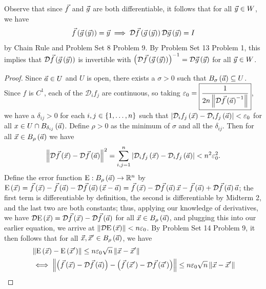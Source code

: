 \documentclass[main.tex]{subfiles}
\begin{document}
\begin{remark}
    Observe that since $\vec{f}$ and $\vec{g}$ are both differentiable, it follows that for all $\vec{y}\in W$, we have
    \[\vec{f}\left( \vec{g}\left( \vec{y} \right) \right) = \vec{y} \implies \mathcal{D}\vec{f}\left( \vec{g}\left( \vec{y} \right) \right)\mathcal{D}\vec{g}\left( \vec{y} \right) = I\]
    by Chain Rule and Problem Set 8 Problem 9. By Problem Set 13 Problem 1, this implies that $\mathcal{D}\vec{f}\left( \vec{g}\left( \vec{y} \right) \right)$ is invertible with $\left( \mathcal{D}\vec{f}\left( \vec{g}\left( \vec{y} \right) \right) \right)^{-1} = \mathcal{D}\vec{g}\left( \vec{y} \right)$ for all $\vec{y}\in W$.
\end{remark}

\begin{proof}
    Since $\vec{a}\in U$ and $U$ is open, there exists a $\sigma > 0$ such that $B_\sigma\left( \vec{a} \right)\subseteq U$. Since $f$ is $C^1$, each of the $\mathcal{D}_if_j$ are continuous, so taking $\varepsilon_0 = \boxed{\frac{1}{2n\left\lVert \mathcal{D}\vec{f}\left( \vec{a} \right)^{-1} \right\rVert}}$, we have a $\delta_{ij} > 0$ for each $i,j \in \left\{ 1, \ldots , n \right\}$ such that $\left\lvert \mathcal{D}_if_j\left( \vec{x} \right) - \mathcal{D}_if_j\left( \vec{a} \right) \right\rvert < \varepsilon_0$ for all $x\in U \cap B_{\delta_{ij}}\left( \vec{a} \right)$. Define $\rho > 0$ as the minimum of $\sigma$ and all the $\delta_{ij}$. Then for all $\vec{x}\in B_\rho\left( \vec{a} \right)$ we have
    \[\left\lVert \mathcal{D}\vec{f}\left( \vec{x} \right) - \mathcal{D}\vec{f}\left( \vec{a} \right) \right\rVert^2 = \sum_{i, j = 1}^n \left\lvert \mathcal{D}_if_j\left( \vec{x} \right) - \mathcal{D}_if_j\left( \vec{a} \right) \right\rvert < n^2\varepsilon_0^2.\]
    Define the error function $\mathrm{E} : B_\rho\left( \vec{a} \right)\to \mathbb R^n$ by $\mathrm{E}\left( \vec{x} \right) = \vec{f}\left( \vec{x} \right) - \vec{f}\left( \vec{a} \right) - \mathcal{D}\vec{f}\left( \vec{a} \right)\left( \vec{x} - \vec{a} \right) = \vec{f}\left( \vec{x} \right) - \mathcal{D}\vec{f}\left( \vec{a} \right)\vec{x} - \vec{f}\left( \vec{a} \right) + \mathcal{D}\vec{f}\left( \vec{a} \right)\vec{a}$; the first term is differentiable by definition, the second is differentiable by Midterm 2, and the last two are both constants; thus, applying our knowledge of derivatives, we have $\mathcal{D}\mathrm{E}\left( \vec{x} \right) = \mathcal{D}\vec{f}\left( \vec{x} \right) - \mathcal{D}\vec{f}\left( \vec{a} \right)$ for all $\vec{x}\in B_\rho\left( \vec{a} \right)$, and plugging this into our earlier equation, we arrive at $\left\lVert \mathcal{D}\mathrm{E}\left( \vec{x} \right) \right\rVert < n\varepsilon_0$. By Problem Set 14 Problem 9, it then follows that for all $\vec{x}, \vec{x}'\in B_\rho\left( \vec{a} \right)$, we have
    \begin{align*}
        &\norm{\mathrm{E}\parens{\vx} - \mathrm{E}\parens{\vx'}} \le n\varepsilon_0 \sqrt{n}\norm{\vx - \vx'} \\
        &\iff \norm{\parens{\vf\parens{\vx} - \mathcal{D}\vf\parens{\va}} - \parens{\vf\parens{\vx'} - \mathcal{D}\vf\parens{\va'}}} \le n\varepsilon_0 \sqrt{n}\norm{\vx - \vx'} \\

\end{align*}
\end{proof}
\end{document}
